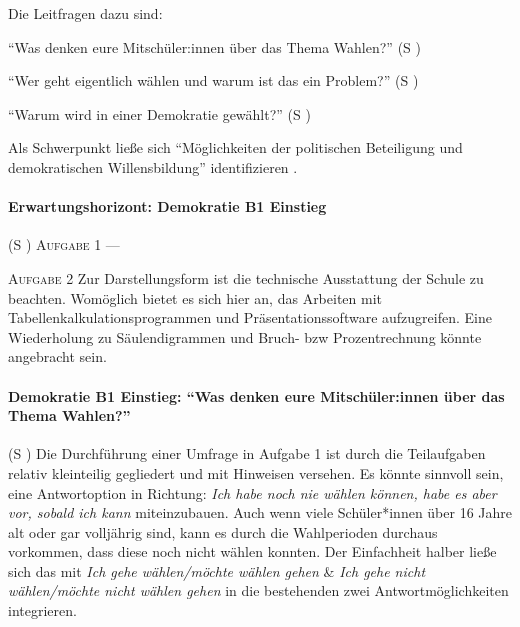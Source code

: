 Die Leitfragen dazu sind: 
\begin{myenumerate}
    \item \enquote{Was denken eure Mitschüler:innen über das Thema Wahlen?} (\gls{S} \pageref{DEMOKRATIE-B1})
    \item \enquote{Wer geht eigentlich wählen und warum ist das ein Problem?} (\gls{S} \pageref{DEMOKRATIE-B2})
    \item \enquote{Warum wird in einer Demokratie gewählt?} (\gls{S} \pageref{DEMOKRATIE-B3})
\end{myenumerate}
Als Schwerpunkt ließe sich
\enquote{Möglichkeiten der politischen Beteiligung und demokratischen Willensbildung} identifizieren \autocite[][16]{bplan}.


\paragraph{Erwartungshorizont: Demokratie B1 Einstieg} (\gls{S} \pageref{DEMOKRATIE-B1})
\textsc{Aufgabe 1} \quad ---

\textsc{Aufgabe 2} \quad Zur Darstellungsform ist die technische Ausstattung der Schule zu beachten. Womöglich bietet es sich hier an, das Arbeiten mit Tabellenkalkulationsprogrammen und Präsentationssoftware aufzugreifen.  Eine Wiederholung zu Säulendigrammen und Bruch- \gls{bzw} Prozentrechnung könnte angebracht sein. 
\\


\paragraph{Demokratie B1 Einstieg: \enquote{Was denken eure Mitschüler:innen über das Thema Wahlen?}}  (\gls{S} \pageref{DEMOKRATIE-B1})
Die Durchführung einer Umfrage in Aufgabe 1 ist durch die Teilaufgaben relativ kleinteilig gegliedert und mit Hinweisen versehen. Es könnte sinnvoll sein, eine Antwortoption in Richtung: \emph{Ich habe noch nie wählen können, habe es aber vor, sobald ich kann} miteinzubauen. Auch wenn viele Schüler*innen über 16 Jahre alt oder gar volljährig sind, kann es durch die Wahlperioden durchaus vorkommen, dass diese noch nicht wählen konnten. 
Der Einfachheit halber ließe sich das mit \emph{Ich gehe wählen/möchte wählen gehen} \& \emph{Ich gehe nicht wählen/möchte nicht wählen gehen} in die bestehenden zwei Antwortmöglichkeiten integrieren. 

